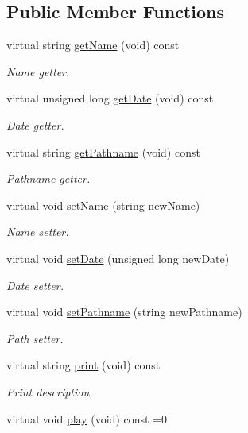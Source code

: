\subsection*{Public Member Functions}
\begin{DoxyCompactItemize}
\item 
virtual string \hyperlink{class_multimedia_a8cc74dd745e553a881e6d5b210a542f6}{get\-Name} (void) const 
\begin{DoxyCompactList}\small\item\em Name getter. \end{DoxyCompactList}\item 
virtual unsigned long \hyperlink{class_multimedia_a8c5b6295faee6c9690a513dd0f4b4a79}{get\-Date} (void) const 
\begin{DoxyCompactList}\small\item\em Date getter. \end{DoxyCompactList}\item 
virtual string \hyperlink{class_multimedia_a6cff0cb9e8a32d2589c77ebf37250da3}{get\-Pathname} (void) const 
\begin{DoxyCompactList}\small\item\em Pathname getter. \end{DoxyCompactList}\item 
virtual void \hyperlink{class_multimedia_a7af3fbc7c6f5eab1a70608066f05d03d}{set\-Name} (string new\-Name)
\begin{DoxyCompactList}\small\item\em Name setter. \end{DoxyCompactList}\item 
virtual void \hyperlink{class_multimedia_a14abd8762b4d64cba41822f2b8ad434f}{set\-Date} (unsigned long new\-Date)
\begin{DoxyCompactList}\small\item\em Date setter. \end{DoxyCompactList}\item 
virtual void \hyperlink{class_multimedia_a3e06f151e9fce4cad4f74e4b92276929}{set\-Pathname} (string new\-Pathname)
\begin{DoxyCompactList}\small\item\em Path setter. \end{DoxyCompactList}\item 
virtual string \hyperlink{class_multimedia_a4960a7ffd22e90f74291ebf86eccf820}{print} (void) const 
\begin{DoxyCompactList}\small\item\em Print description. \end{DoxyCompactList}\item 
\hypertarget{class_multimedia_aa245ab56eb2877b384b3638734d6762e}{virtual void \hyperlink{class_multimedia_aa245ab56eb2877b384b3638734d6762e}{play} (void) const =0}\label{class_multimedia_aa245ab56eb2877b384b3638734d6762e}


\end{DoxyCompactItemize}
